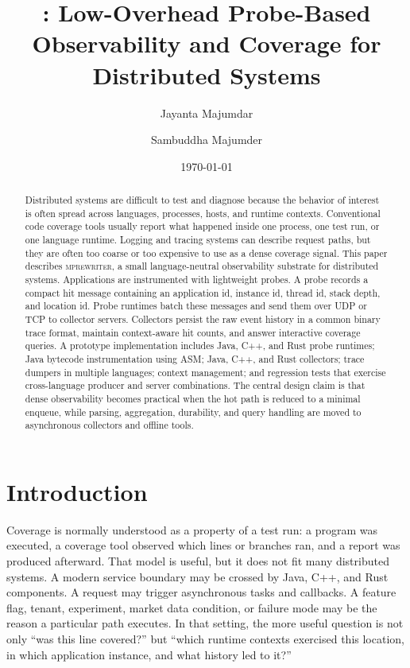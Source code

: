 \documentclass[11pt]{article}
\title{\tool: Low-Overhead Probe-Based Observability and Coverage for Distributed Systems}
\author{Jayanta Majumdar \and Sambuddha Majumder}
\date{\today}
\newcommand{\tool}{\textsc{mprewriter}}
\begin{document}
\maketitle

\begin{abstract}
Distributed systems are difficult to test and diagnose because the behavior of
interest is often spread across languages, processes, hosts, and runtime
contexts. Conventional code coverage tools usually report what happened inside
one process, one test run, or one language runtime. Logging and tracing systems
can describe request paths, but they are often too coarse or too expensive to
use as a dense coverage signal. This paper describes \tool, a small
language-neutral observability substrate for distributed systems. Applications
are instrumented with lightweight probes. A probe records a compact hit message
containing an application id, instance id, thread id, stack depth, and location
id. Probe runtimes batch these messages and send them over UDP or TCP to
collector servers. Collectors persist the raw event history in a common binary
trace format, maintain context-aware hit counts, and answer interactive
coverage queries. A prototype implementation includes Java, C++, and Rust
probe runtimes; Java bytecode instrumentation using ASM; Java, C++, and Rust
collectors; trace dumpers in multiple languages; context management; and
regression tests that exercise cross-language producer and server
combinations. The central design claim is that dense observability becomes
practical when the hot path is reduced to a minimal enqueue, while parsing,
aggregation, durability, and query handling are moved to asynchronous
collectors and offline tools.
\end{abstract}

\section{Introduction}

Coverage is normally understood as a property of a test run: a program was
executed, a coverage tool observed which lines or branches ran, and a report was
produced afterward. That model is useful, but it does not fit many distributed
systems. A modern service boundary may be crossed by Java, C++, and Rust
components. A request may trigger asynchronous tasks and callbacks. A feature
flag, tenant, experiment, market data condition, or failure mode may be the
reason a particular path executes. In that setting, the more useful question is
not only ``was this line covered?'' but ``which runtime contexts exercised this
location, in which application instance, and what history led to it?''
\end{document}
